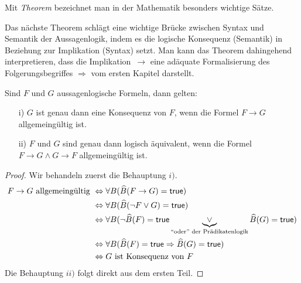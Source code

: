 \begin{rk}
    Mit \textit{Theorem} bezeichnet man in der Mathematik besonders wichtige Sätze.
\end{rk}

Das nächste Theorem schlägt eine wichtige Brücke zwischen Syntax und Semantik der Aussagenlogik, indem es die logische Konsequenz (Semantik) in Beziehung zur Implikation
(Syntax) setzt. Man kann das Theorem dahingehend interpretieren, dass die Implikation~$\to$ eine adäquate Formalisierung des Folgerungsbegriffes $\Rightarrow$ vom ersten Kapitel darstellt.

\begin{thrm}[Folgerungstheorem]\label{thrm:deduktionstheorem}
    Sind $F$ und $G$ aussagenlogische Formeln, dann gelten:
    \begin{enumerate}
        \item[i)] $G$ ist genau dann eine Konsequenz von $F$, wenn die Formel $F\to G$ allgemeingültig ist.
        \item[ii)] $F$ und $G$ sind genau dann logisch äquivalent, wenn die Formel $F\to G\land G\to F$ allgemeingültig ist.
    \end{enumerate}
\end{thrm}
\begin{proof}
    Wir behandeln zuerst die Behauptung $i)$.
    \begin{align*}
    F\to G\text{ allgemeingültig } &\Leftrightarrow \forall B(\widehat{B}(F\to G) =\mathsf{true})\\
    &\Leftrightarrow \forall B(\widehat{B}(\neg F\lor G) =\mathsf{true})\\
    &\Leftrightarrow \forall B(\neg \widehat{B}(F)=\mathsf{true}\underbrace{\lor}_{\text{``oder'' der Prädikatenlogik}} \widehat{B}(G) =\mathsf{true})\\
    &\Leftrightarrow \forall B(\widehat{B}(F)=\mathsf{true}\Rightarrow \widehat{B}(G)=\mathsf{true})\\
    &\Leftrightarrow G\text{ ist Konsequenz von }F
    \end{align*}
    Die Behauptung $ii)$ folgt direkt aus dem ersten Teil.\qedhere
\end{proof}



